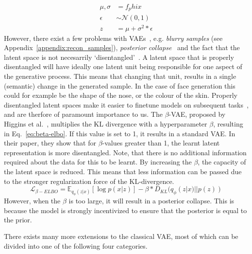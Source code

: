 \begin{equation}
    \begin{split}
        \mu, \sigma & = f_phi{x}                  \\
        \epsilon    & \sim \mathcal{N}(0, 1)      \\
        z           & = \mu + \sigma^2 * \epsilon
    \end{split}
    \label{eq:reparameterization-trick}
\end{equation}
However, there exist a few problems with VAEs~\cite{tomczak2021deep}, e.g. \emph{blurry samples} (see Appendix~\ref{appendix:recon_samples}), \emph{posterior collapse}~\cite{DBLP:journals/corr/BowmanVVDJB15} and the fact that the latent space is not necesarrily `disentangled'~\cite{higgins2017betavae}. A latent space that is properly disentangled will have ideally one latent unit being responsible for one aspect of the generative process. This means that changing that unit, results in a single (semantic) change in the generated sample. In the case of face generation this could for example be the shape of the nose, or the colour of the skin. Properly disentangled latent spaces make it easier to finetune models on subsequent tasks~\cite{bengio2014representationlearningreviewnew}, and are therfore of paramount importance to us. The $\beta$-VAE, proposed by Higgins et al.~\cite{higgins2017betavae}, multiplies the KL divergence with a hyperparameter $\beta$, resulting in Eq.~\ref{eq:beta-elbo}. If this value is set to 1, it results in a standard VAE. In their paper, they show that for $\beta$-values greater than 1, the learnt latent representation is more disentangled. Note, that there is no additional information required about the data for this to be learnt. By increasing the $\beta$, the capacity of the latent space is reduced. This means that less information can be passed due to the stronger regularization force of the KL-divergence.
\begin{equation}
    \mathcal{L}_{\beta-ELBO} = \mathbb{E}_{q_{\phi}(z|x)}[\log p(x|z)] - \beta * D_{KL}(q_{\phi}(z|x) || p(z))
    \label{eq:beta-elbo}
\end{equation}
However, when the $\beta$ is too large, it will result in a posterior collapse. This is because the model is strongly incentivized to ensure that the posterior is equal to the prior.

There exists many more extensions to the classical VAE, most of which can be divided into one of the following four categories.

